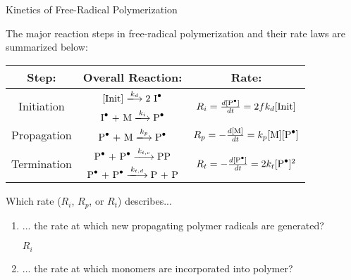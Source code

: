 \begin{activity}{Kinetics of Free-Radical Polymerization}
\begin{ctqs}
\begin{enumerate}
		\end{enumerate}

\end{ctqs}



\begin{model}
\label{\labelbase:mdl:kineticssummary}

	The major reaction steps in free-radical polymerization and their rate laws are summarized below:
	
	\begin{center}
		\renewcommand{\arraystretch}{2}
		\begin{tabular}{c c c}
			\textbf{Step:} & \textbf{Overall Reaction:} & \textbf{Rate:}\\\hline
			\multirow{2}{*}{Initiation} & $[\text{Init}] \xlongrightarrow{k_d} \text{2 \ce{I^.}}$ & \multirow{2}{*}{$ R_i = \frac{d\text{[\ce{P^.}]}}{dt} = 2fk_d[\text{Init}]$}\\
			 & $\text{\ce{I^.} + M} \xlongrightarrow{k_i} \text{\ce{P^.}}$ & \\\hline
			Propagation & $\text{\ce{P^.} + M} \xlongrightarrow{k_p} \text{\ce{P^.}}$ & $R_p = -\frac{d[\text{M}]}{dt} = k_p\text{[M][\ce{P^.}]}$\\\hline
			\multirow{2}{*}{Termination} & $\text{\ce{P^.} + \ce{P^.}} \xlongrightarrow{k_{t,c}} \text{\ce{PP}}$ & \multirow{2}{*}{$R_t = -\frac{d[\text{\ce{P^.}}]}{dt} = 2k_t [\text{\ce{P^.}}]^2$}\\
			& $\text{\ce{P^.} + \ce{P^.}} \xlongrightarrow{k_{t,d}} \text{P + P}$ & \\\hline
		\end{tabular}
	\end{center}
	\vspace{6pt}

\end{model}

\begin{ctqs}

	\question Which rate ($R_i$, $R_p$, or $R_t$) describes...
	
		\begin{enumerate}
			\item ... the rate at which new propagating polymer radicals are generated?
			
				\begin{solution}[0.4in]
					$R_i$
				\end{solution}
				
			\item ... the rate at which monomers are incorporated into polymer?
			

\end{enumerate}
\end{ctqs}
\end{activity}
